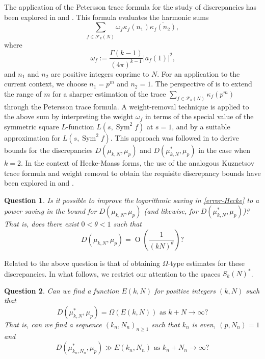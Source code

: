 \documentclass[reqno]{amsart}
\theoremstyle{plain}
\newtheorem*{unmques}{Question}
\theoremstyle{definition}
\theoremstyle{remark}
\def\Sym{\operatorname{Sym}}
\def\O{\operatorname{O}}
\begin{document}
The application of the Petersson trace formula for the study of discrepancies has been explored in \cite{JS} and \cite{SZ}.   This formula evaluates the harmonic sums 
$$\sum_{f \in \mathcal F_k(N)} \omega_f \kappa_f(n_1)\overline{\kappa_f(n_2)},$$
where 
\begin{equation}\label{omega-f}
\,\omega_f := \frac{\Gamma(k-1)}{(4\pi)^{k-1}} |a_f(1)|^2,
\end{equation}
and $n_1$ and $n_2$ are positive integers coprime to $N$.  For an application to the current context, we choose $n_1 = p^m$ and $n_2 = 1$.  The perspective of \cite{SZ} is to extend the range of $m$ for a sharper estimation of the trace $\sum_{f \in \mathcal F_k(N)} \kappa_f(p^m)$ through the Petersson trace formula.  A weight-removal technique is applied to the above sum by interpreting the weight $\omega_f$ in terms of the special value of the symmetric square $L$-function $L(s,\Sym^2f)$ at $s=1$, and by a suitable approximation for $L(s,\Sym^2f)$.  This approach was followed in \cite{SZ} to derive bounds for the discrepancies $D(\mu_{k,N},\mu_p)$ and $D(\mu^*_{k,N},\mu_p)$ in the case when $k = 2$.  In the context of Hecke-Maass forms, the use of the analogous Kuznetsov trace formula and weight removal to obtain the requisite discrepancy bounds have been explored in \cite{LW} and \cite{TW}.  







  
 \begin{unmques}Is it possible to improve the logarithmic saving in \eqref{error-Hecke} to a power saving in the bound for $D(\mu_{k,N},\mu_p)$ (and likewise, for $D(\mu_{k,N}^*,\mu_p)$)? That is, does there exist $0 < \theta <1$ such that 
 $$D(\mu_{k,N},\mu_p) = \O\left(\frac{1}{(kN)^{\theta}}\right)?$$
 \end{unmques}
 Related to the above question is that of obtaining $\Omega$-type estimates for these discrepancies.  In what follows, we restrict our attention to the spaces $S_k(N)^*$.
\begin{unmques}
Can we find a function $E(k,N)$ for positive integers $(k, N)$ such that 
$$D(\mu_{k,N}^*,\mu_p) = \Omega (E(k,N))\text{ as }k + N \to \infty ?$$
That is, can we find a sequence $(k_{n},N_{n})_{n \geq 1}$ such that $k_{n}$ is even, $(p,N_{n}) = 1$ and 
$$D(\mu_{k_{n},N_{n}}^*,\mu_p) \gg E\left(k_{n},N_{n}\right) \text{ as }k_{n} + N_{n} \to \infty ?$$
\end{unmques}
\end{document}
